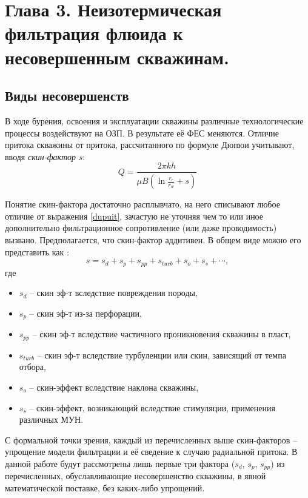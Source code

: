 \section*{Глава 3. Неизотермическая фильтрация флюида к несовершенным скважинам.}

\setcounter{section}{3}
\setcounter{subsection}{0}
\setcounter{equation}{0}

\subsection{Виды несовершенств}
	В ходе бурения, освоения и эксплуатации скважины различные технологические процессы воздействуют на ОЗП.
	В результате её ФЕС меняются.
	Отличие притока скважины от притока, рассчитанного по формуле Дюпюи учитывают, вводя \textit{скин-фактор} $s$:
\begin{equation}
	\label{dupuit}
	Q = \frac{2\pi k h}{\mu B \left(\ln\displaystyle\frac{r_e}{r_w}+s\right)}
\end{equation}

	Понятие скин-фактора достаточно расплывчато, на него списывают любое отличие от выражения \eqref{dupuit}, зачастую не уточняя чем то или иное дополнительно фильтрационное сопротивление (или даже проводимость) вызвано. Предполагается, что скин-фактор аддитивен. В общем виде можно его представить как \cite{mukerdzhi}:
\begin{equation}
	\label{skin_full}
	s = s_d + s_p + s_{pp} + s_{turb} + s_o + s_s + \cdots,
\end{equation}
	где
\begin{itemize}
\item $s_d$ -- скин эф-т вследствие повреждения породы,
\item $s_p$ -- скин эф-т из-за перфорации,
\item $s_{pp}$ -- скин эф-т вследствие частичного проникновения скважины в пласт,
\item $s_{turb}$ -- скин эф-т вследствие турбуленции или скин, зависящий от темпа отбора,
\item $s_{o}$ -- скин-эффект вследствие наклона скважины,
\item $s_{s}$ -- скин-эффект, возникающий вследствие стимуляции, применения различных МУН.
\end{itemize}
	С формальной точки зрения, каждый из перечисленных выше скин-факторов -- упрощение модели фильтрации и её сведение к случаю радиальной притока. В данной работе будут рассмотрены лишь первые три фактора ($s_d$, $s_p$, $s_{pp}$) из перечисленных, обуславливающие несовершенство скважины, в явной математической поставке, без каких-либо упрощений.


